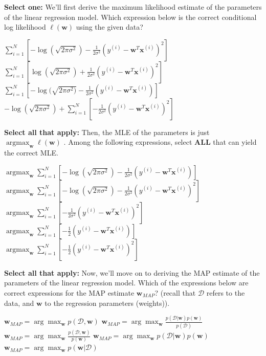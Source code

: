 \documentclass[11pt,addpoints,answers]{exam}
\newcommand \argmax {\operatorname*{argmax}}
\newcommand{\sall}{\textbf{Select all that apply: }}
\newcommand{\sone}{\textbf{Select one: }}
\newcommand{\D}{\mathcal{D}}
\begin{document}
\begin{questions}
\begin{parts}
\begin{subparts}
    
    \subpart[2] \sone We'll first derive the maximum likelihood estimate of the parameters of the linear regression model. Which expression below is the correct conditional log likelihood $\ell(\mathbf{w})$ using the given data?

    \begin{checkboxes}
        \choice $\sum_{i=1}^{N} [-\log (\sqrt{2\pi\sigma^2}) - \frac{1}{2\sigma^2} (y^{(i)} - \mathbf{w}^T\mathbf{x}^{(i)})^2]$
        \choice $\sum_{i=1}^{N} [\log (\sqrt{2\pi\sigma^2}) + \frac{1}{2\sigma^2} (y^{(i)} - \mathbf{w}^T\mathbf{x}^{(i)})^2]$
        \choice $\sum_{i=1}^{N} [-\log(\sqrt{2\pi\sigma^2)} - \frac{1}{2\sigma^2} (y^{(i)} - \mathbf{w}^T\mathbf{x}^{(i)})]$
        \choice $-\log (\sqrt{2\pi\sigma^2}) + \sum_{i=1}^{N} [-\frac{1}{2\sigma^2} (y^{(i)} - \mathbf{w}^T\mathbf{x}^{(i)})^2]$
    \end{checkboxes}
    
    
    \subpart[3] \sall Then, the MLE of the parameters is just  $\argmax_{\mathbf{w}} \ell(\mathbf{w})$ . Among the following expressions, select \textbf{ALL} that can yield the correct MLE. 

    {\checkboxchar{$\Box$} \checkedchar{$\blacksquare$}
    \begin{checkboxes}
        \choice $\argmax_{\mathbf{w}} \sum_{i=1}^{N} [-\log (\sqrt{2\pi\sigma^2}) - \frac{1}{2\sigma^2} (y^{(i)} - \mathbf{w}^T\mathbf{x}^{(i)})]$
        \choice $\argmax_{\mathbf{w}} \sum_{i=1}^{N} [-\log (\sqrt{2\pi\sigma^2}) - \frac{1}{2\sigma^2} (y^{(i)} - \mathbf{w}^T\mathbf{x}^{(i)})^2]$
        \choice $\argmax_{\mathbf{w}} \sum_{i=1}^{N} [- \frac{1}{2\sigma^2} (y^{(i)} - \mathbf{w}^T\mathbf{x}^{(i)})^2]$
        \choice $\argmax_{\mathbf{w}} \sum_{i=1}^{N} [- \frac{1}{2} (y^{(i)} - \mathbf{w}^T\mathbf{x}^{(i)})]$
        \choice $\argmax_{\mathbf{w}} \sum_{i=1}^{N} [- \frac{1}{2} (y^{(i)} - \mathbf{w}^T\mathbf{x}^{(i)})^2]$
    \end{checkboxes}
    }
    
    \subpart[3] \sall Now, we'll move on to deriving the MAP estimate of the parameters of the linear regression model. Which of the expressions below are correct expressions for the MAP estimate $\mathbf{w}_{MAP}$? (recall that $\D$ refers to the data, and $\mathbf{w}$ to the regression parameters (weights)).
    

    {\checkboxchar{$\Box$} \checkedchar{$\blacksquare$}
    \begin{checkboxes}
        \choice $\mathbf{w}_{MAP} = \arg\max_{\mathbf{w}} p(\D, \mathbf{w})$
        \choice $\mathbf{w}_{MAP} = \arg\max_{\mathbf{w}} \frac{p(\D| \mathbf{w})p(\mathbf{w})}{p(\D)}$
        \choice $\mathbf{w}_{MAP} = \arg\max_{\mathbf{w}} \frac{p(\D, \mathbf{w})}{p(\mathbf{w})}$
        \choice $\mathbf{w}_{MAP} = \arg\max_{\mathbf{w}} p(\D| \mathbf{w})p(\mathbf{w})$
        \choice $\mathbf{w}_{MAP} = \arg\max_{\mathbf{w}} p(\mathbf{w}| \D)$
    \end{checkboxes}
    }
    

\end{subparts}
\end{parts}
\end{questions}
\end{document}
